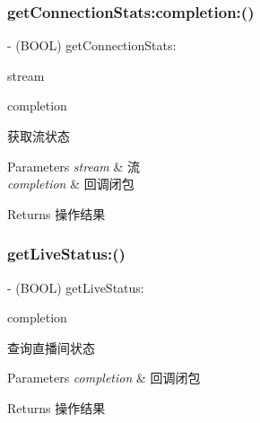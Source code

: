 \subsubsection{\texorpdfstring{get\+Connection\+Stats\+:completion\+:()}{getConnectionStats:completion:()}}
{\footnotesize\ttfamily -\/ (B\+O\+OL) get\+Connection\+Stats\+: \begin{DoxyParamCaption}\item[{(\hyperlink{interface_c_c_stream}{C\+C\+Stream} $\ast$)}]{stream }\item[{completion:(C\+C\+Comletion\+Block)}]{completion }\end{DoxyParamCaption}}

获取流状态 
\begin{DoxyParams}{Parameters}
{\em stream} & 流 \\
\hline
{\em completion} & 回调闭包 \\
\hline
\end{DoxyParams}
\begin{DoxyReturn}{Returns}
操作结果 
\end{DoxyReturn}
\mbox{\label{interface_c_c_streamer_basic_a572cf57c93623e0eaf87514737db5729}} 
\subsubsection{\texorpdfstring{get\+Live\+Status\+:()}{getLiveStatus:()}}
{\footnotesize\ttfamily -\/ (B\+O\+OL) get\+Live\+Status\+: \begin{DoxyParamCaption}\item[{(C\+C\+Comletion\+Block)}]{completion }\end{DoxyParamCaption}}

查询直播间状态 
\begin{DoxyParams}{Parameters}
{\em completion} & 回调闭包 \\
\hline
\end{DoxyParams}
\begin{DoxyReturn}{Returns}
操作结果 
\end{DoxyReturn}
\mbox{\label{interface_c_c_streamer_basic_a56e16b52ed8d9e0c4c497187a09fbd8d}} 
